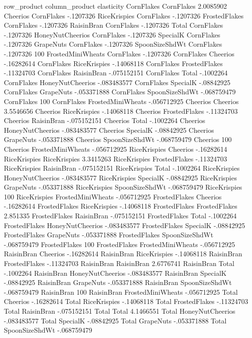 row_product	column_product	elasticity
CornFlakes	CornFlakes	2.0085902
Cheerios	CornFlakes	-.1207326
RiceKrispies	CornFlakes	-.1207326
FrostedFlakes	CornFlakes	-.1207326
RaisinBran	CornFlakes	-.1207326
Total	CornFlakes	-.1207326
HoneyNutCheerios	CornFlakes	-.1207326
SpecialK	CornFlakes	-.1207326
GrapeNuts	CornFlakes	-.1207326
SpoonSizeShdWt	CornFlakes	-.1207326
100%
FrostedMiniWheats	CornFlakes	-.1207326
CornFlakes	Cheerios	-.16282614
CornFlakes	RiceKrispies	-.14068118
CornFlakes	FrostedFlakes	-.11324703
CornFlakes	RaisinBran	-.075152151
CornFlakes	Total	-.1002264
CornFlakes	HoneyNutCheerios	-.083483577
CornFlakes	SpecialK	-.08842925
CornFlakes	GrapeNuts	-.053371888
CornFlakes	SpoonSizeShdWt	-.068759479
CornFlakes	100%
CornFlakes	FrostedMiniWheats	-.056712925
Cheerios	Cheerios	3.5546656
Cheerios	RiceKrispies	-.14068118
Cheerios	FrostedFlakes	-.11324703
Cheerios	RaisinBran	-.075152151
Cheerios	Total	-.1002264
Cheerios	HoneyNutCheerios	-.083483577
Cheerios	SpecialK	-.08842925
Cheerios	GrapeNuts	-.053371888
Cheerios	SpoonSizeShdWt	-.068759479
Cheerios	100%
Cheerios	FrostedMiniWheats	-.056712925
RiceKrispies	Cheerios	-.16282614
RiceKrispies	RiceKrispies	3.3415263
RiceKrispies	FrostedFlakes	-.11324703
RiceKrispies	RaisinBran	-.075152151
RiceKrispies	Total	-.1002264
RiceKrispies	HoneyNutCheerios	-.083483577
RiceKrispies	SpecialK	-.08842925
RiceKrispies	GrapeNuts	-.053371888
RiceKrispies	SpoonSizeShdWt	-.068759479
RiceKrispies	100%
RiceKrispies	FrostedMiniWheats	-.056712925
FrostedFlakes	Cheerios	-.16282614
FrostedFlakes	RiceKrispies	-.14068118
FrostedFlakes	FrostedFlakes	2.851335
FrostedFlakes	RaisinBran	-.075152151
FrostedFlakes	Total	-.1002264
FrostedFlakes	HoneyNutCheerios	-.083483577
FrostedFlakes	SpecialK	-.08842925
FrostedFlakes	GrapeNuts	-.053371888
FrostedFlakes	SpoonSizeShdWt	-.068759479
FrostedFlakes	100%
FrostedFlakes	FrostedMiniWheats	-.056712925
RaisinBran	Cheerios	-.16282614
RaisinBran	RiceKrispies	-.14068118
RaisinBran	FrostedFlakes	-.11324703
RaisinBran	RaisinBran	2.6776741
RaisinBran	Total	-.1002264
RaisinBran	HoneyNutCheerios	-.083483577
RaisinBran	SpecialK	-.08842925
RaisinBran	GrapeNuts	-.053371888
RaisinBran	SpoonSizeShdWt	-.068759479
RaisinBran	100%
RaisinBran	FrostedMiniWheats	-.056712925
Total	Cheerios	-.16282614
Total	RiceKrispies	-.14068118
Total	FrostedFlakes	-.11324703
Total	RaisinBran	-.075152151
Total	Total	4.1466551
Total	HoneyNutCheerios	-.083483577
Total	SpecialK	-.08842925
Total	GrapeNuts	-.053371888
Total	SpoonSizeShdWt	-.068759479
